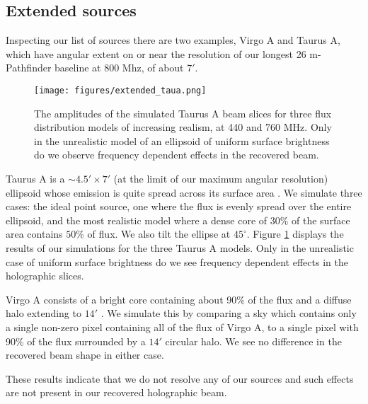 \subsection{Extended sources}

Inspecting our list of sources there are two examples, Virgo A and Taurus A, which have angular extent on or near the resolution of our longest 26 m-Pathfinder baseline at 800 Mhz, of about $7'$. 
\begin{figure}[h] %
	\centering	
	\texttt{[image: figures/extended\_taua.png]}%
	\caption{The amplitudes of the simulated Taurus A beam slices for three flux distribution models of increasing realism, at 440 and 760 MHz. Only in the unrealistic model of an ellipsoid of uniform surface brightness do we observe frequency dependent effects in the recovered beam.}
	\label{crabsim}
\end{figure}

Taurus A is a $\sim 4.5'\times 7'$ (at the limit of our maximum angular resolution) ellipsoid whose emission is quite spread across its surface area \citep{crab}. We simulate three cases: the ideal point source, one where the flux is evenly spread over the entire ellipsoid, and the most realistic model where a dense core of $30\%$ of the surface area contains $50\%$ of flux. We also tilt the ellipse at $45^{\circ}$. Figure \ref{crabsim} displays the results of our simulations for the three Taurus A models. Only in the unrealistic case of uniform surface brightness do we see frequency dependent effects in the holographic slices.

Virgo A consists of a bright core containing about 90$\%$ of the flux and a diffuse halo extending to $14'$ \citep{baars, m87lofar}. We simulate this by comparing a sky which contains only a single non-zero pixel containing all of the flux of Virgo A, to a single pixel with 90$\%$ of the flux surrounded by a $14'$ circular halo. We see no difference in the recovered beam shape in either case.

These results indicate that we do not resolve any of our sources and such effects are not present in our recovered holographic beam.

